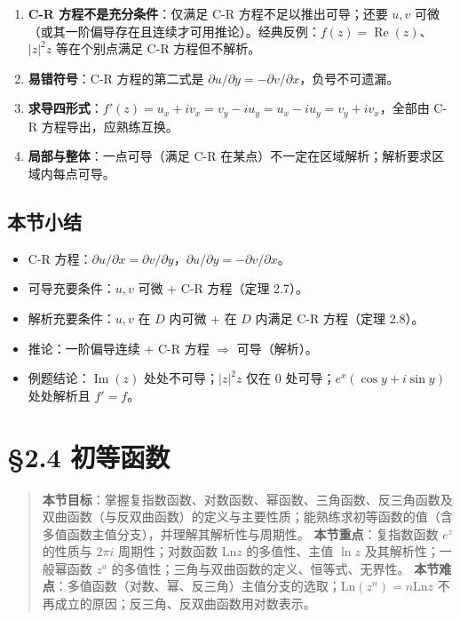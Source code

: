 \begin{enumerate}
\def\labelenumi{\arabic{enumi}.}
\tightlist
\item
  \textbf{C-R 方程不是充分条件}：仅满足 C-R 方程不足以推出可导；还要
  \(u,v\)
  可微（或其一阶偏导存在且连续才可用推论）。经典反例：\(f(z)=\operatorname{Re}(z)\)、\(|z|^2z\)
  等在个别点满足 C-R 方程但不解析。
\item
  \textbf{易错符号}：C-R 方程的第二式是
  \(\partial u/\partial y=-\partial v/\partial x\)，负号不可遗漏。
\item
  \textbf{求导四形式}：\(f'(z)=u_x+iv_x=v_y-iu_y=u_x-iu_y=v_y+iv_x\)，全部由
  C-R 方程导出，应熟练互换。
\item
  \textbf{局部与整体}：一点可导（满足 C-R
  在某点）不一定在区域解析；解析要求区域内每点可导。
\end{enumerate}

\subsection{本节小结}\label{ux672cux8282ux5c0fux7ed3-5}

\begin{itemize}
\tightlist
\item
  C-R
  方程：\(\partial u/\partial x=\partial v/\partial y\)，\(\partial u/\partial y=-\partial v/\partial x\)。
\item
  可导充要条件：\(u,v\) 可微 + C-R 方程（定理 2.7）。
\item
  解析充要条件：\(u,v\) 在 \(D\) 内可微 + 在 \(D\) 内满足 C-R 方程（定理
  2.8）。
\item
  推论：一阶偏导连续 + C-R 方程 \(\Rightarrow\) 可导（解析）。
\item
  例题结论：\(\operatorname{Im}(z)\) 处处不可导；\(|z|^2z\) 仅在 \(0\)
  处可导；\(e^x(\cos y+i\sin y)\) 处处解析且 \(f'=f\)。
\end{itemize}

\section{§2.4 初等函数}\label{ux521dux7b49ux51fdux6570}

\begin{quote}
\textbf{本节目标}：掌握复指数函数、对数函数、幂函数、三角函数、反三角函数及双曲函数（与反双曲函数）的定义与主要性质；能熟练求初等函数的值（含多值函数主值分支），并理解其解析性与周期性。
\textbf{本节重点}：复指数函数 \(e^z\) 的性质与 \(2\pi i\)
周期性；对数函数 \(\mathrm{Ln}z\) 的多值性、主值 \(\ln z\)
及其解析性；一般幂函数 \(z^a\)
的多值性；三角与双曲函数的定义、恒等式、无界性。
\textbf{本节难点}：多值函数（对数、幂、反三角）主值分支的选取；\(\mathrm{Ln}(z^n)=n\mathrm{Ln}z\)
不再成立的原因；反三角、反双曲函数用对数表示。
\end{quote}

